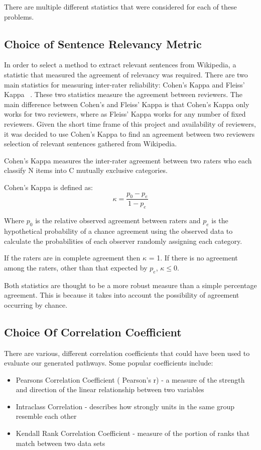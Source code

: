 \documentclass[bsc,frontabs,twoside,singlespacing,parskip,deptreport]{infthesis}     %
\begin{document}
There are multiple different statistics that were considered for each of these problems.
\subsection{Choice of Sentence Relevancy Metric}\label{sec:cohen}
In order to select a method to extract relevant sentences from Wikipedia, a statistic that measured the agreement
of relevancy was required. There are two main statistics for measuring inter-rater reliability: Cohen's Kappa and Fleiss' Kappa ~\cite{gwet2014handbook}.
These two statistics measure the agreement between reviewers. The main difference between Cohen's and Fleiss' Kappa is that
Cohen's Kappa only works for two reviewers, where as Fleiss' Kappa works for any number of fixed reviewers.
Given the short time frame of this project and availability of reviewers, it was decided to use Cohen's Kappa
to find an agreement between two reviewers selection of relevant sentences gathered from Wikipedia.

Cohen's Kappa measures the inter-rater agreement between two raters
who each classify N items into C mutually exclusive categories.

Cohen's Kappa is defined as:\\
\begin{equation}
  \kappa = \frac{p_{0} - p_{e}}{1 - p_{e}}\nonumber
\end{equation}

Where $p_0$ is the relative observed agreement between raters and $p_e$ is the hypothetical probability
of a chance agreement using the observed data to calculate the probabilities of each observer randomly assigning each category.

If the raters are in complete agreement then $\kappa$ = 1.
If there is no agreement among the raters, other than that expected by $p_e$, $\kappa \leq 0$.

Both statistics are thought to be a more robust measure than a simple percentage agreement.
This is because it takes into account the possibility of agreement occurring by chance.

\subsection{Choice Of Correlation Coefficient}\label{sec:kendall}

There are various, different correlation coefficients that could have been used to evaluate our generated pathways.
Some popular coefficients include:
\begin{itemize}
\item Pearsons Correlation Coefficient ( Pearson's r) - a measure of the strength and direction of the linear relationship between two variables
\item Intraclass Correlation - describes how strongly units in the same group resemble each other
\item Kendall Rank Correlation Coefficient -  measure of the portion of ranks that match between two data sets
\end{itemize}
\end{document}
